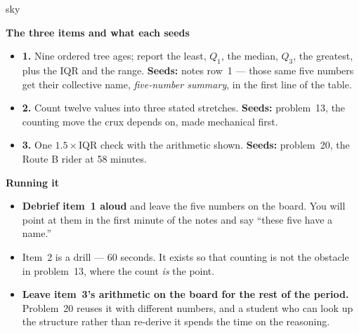 \documentclass[10pt]{article}
\begin{document}
\boxguard[20]
\begin{skillbox}{sky}
\begin{minipage}[t]{0.48\linewidth}
    \textbf{The three items and what each seeds}
    \begin{itemize}
        \item \textbf{1.} Nine ordered tree ages; report the least, $Q_1$, the median, $Q_3$, the
              greatest, plus the IQR and the range. \textbf{Seeds:} notes row~1 --- those same
              five numbers get their collective name, \emph{five-number summary}, in the first
              line of the table.
        \item \textbf{2.} Count twelve values into three stated stretches. \textbf{Seeds:}
              problem~13, the counting move the crux depends on, made mechanical first.
        \item \textbf{3.} One $1.5\times$IQR check with the arithmetic shown. \textbf{Seeds:}
              problem~20, the Route B rider at 58 minutes.
    \end{itemize}
\end{minipage}
\hfill
\begin{minipage}[t]{0.48\linewidth}
    \textbf{Running it}
    \begin{itemize}
        \item \textbf{Debrief item~1 aloud} and leave the five numbers on the board. You will
              point at them in the first minute of the notes and say ``these five have a name.''
        \item Item~2 is a drill --- 60 seconds. It exists so that counting is not the obstacle
              in problem~13, where the count \emph{is} the point.
        \item \textbf{Leave item~3's arithmetic on the board for the rest of the period.}
              Problem~20 reuses it with different numbers, and a student who can look up the
              structure rather than re-derive it spends the time on the reasoning.
    \end{itemize}
\end{minipage}
\end{skillbox}
\end{document}
